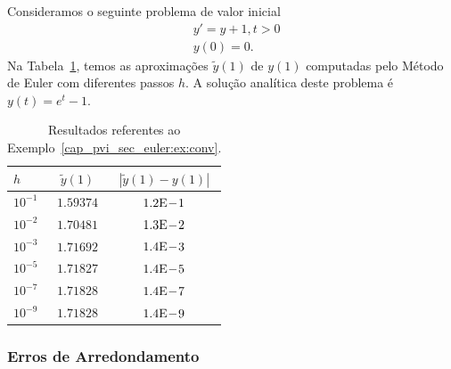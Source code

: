 \begin{ex}\label{cap_pvi_sec_euler:ex:conv}
  Consideramos o seguinte problema de valor inicial
  \begin{subequations}
    \begin{align}
      &y' = y + 1, t>0\\
      &y(0) = 0.
    \end{align}
\end{subequations}
  Na Tabela~\ref{cap_pvi_sec_euler:tab:euler_conv}, temos as aproximações $\tilde{y}(1)$ de $y(1)$ computadas pelo Método de Euler com diferentes passos $h$. A solução analítica deste problema é $y(t) = e^{t}-1$.
 
  \begin{table}[h!]
    \centering
    \caption{Resultados referentes ao Exemplo~\ref{cap_pvi_sec_euler:ex:conv}.}
    \begin{tabular}{l|cc}
      $h$ & $\tilde{y}(1)$ & $|\tilde{y}(1)-y(1)|$\\\hline
      $10^{-1}$ & $1.59374$ & $1.2\mathrm{E}\!-\!1$ \\
      $10^{-2}$ & $1.70481$ & $1.3\mathrm{E}\!-\!2$ \\
      $10^{-3}$ & $1.71692$ & $1.4\mathrm{E}\!-\!3$ \\
      $10^{-5}$ & $1.71827$ & $1.4\mathrm{E}\!-\!5$ \\
      $10^{-7}$ & $1.71828$ & $1.4\mathrm{E}\!-\!7$ \\
      $10^{-9}$ & $1.71828$ & $1.4\mathrm{E}\!-\!9$ \\\hline
    \end{tabular}
    \label{cap_pvi_sec_euler:tab:euler_conv}
  \end{table}
\end{ex}

\subsubsection{Erros de Arredondamento}

